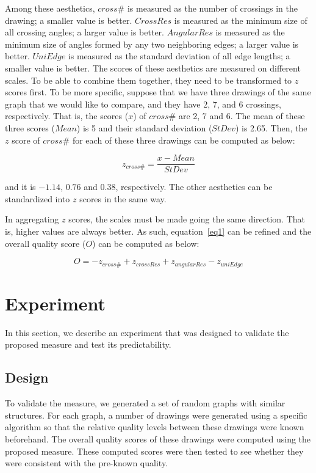 \documentclass[conference,letterpaper]{IEEEtran}
\begin{document}
Among these aesthetics, $cross\#$ is measured as the number of crossings in the drawing; a smaller value is better. $CrossRes$ is measured as the minimum size of all crossing angles; a larger value is better. $AngularRes$ is measured as the minimum size of angles formed by any two neighboring edges; a larger value is better. $UniEdge$ is measured as the standard deviation of all edge lengths; a smaller value is better. The scores of these aesthetics are measured on different scales. To be able to combine them together, they need to be transformed to $z$ scores first. To be more specific, suppose that we have three drawings of the same graph that we would like to compare, and they have 2, 7, and 6 crossings, respectively. That is, the scores ($x$) of $cross\#$ are 2, 7 and 6. The mean of these three scores ($Mean$) is 5 and their standard deviation ($StDev$) is 2.65. Then, the $z$ score of $cross\#$ for each of these three drawings can be computed as below:


\begin{equation}
\label{eq2}
z_{cross\#}=\frac{x-Mean}{StDev}
\end{equation}

\noindent and it is $-1.14$, $0.76$ and $0.38$, respectively. The other aesthetics can be standardized into $z$ scores in the same way.

In aggregating $z$ scores, the scales must be made going the same direction. That is, higher values are always better. As such, equation~\ref{eq1} can be refined and the overall quality score ($O$) can be computed as below:

\begin{equation}
\label{eq3}
O=-z_{cross\#}+z_{crossRes}+z_{angularRes}-z_{uniEdge}
\end{equation}


\section{Experiment} \label{sec:experiment}

In this section, we describe an experiment that was designed to validate the proposed measure and test its predictability.


\subsection{Design}
To validate the measure, we generated a set of random graphs with similar structures. For each graph, a number of drawings were generated using a specific algorithm so that the relative quality levels between these drawings were known beforehand. The overall quality scores of these drawings were computed using the proposed measure. These computed scores were then tested to see whether they were consistent with the pre-known quality. 
\end{document}
